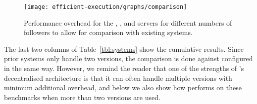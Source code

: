 \begin{figure}[!t]
 \centering
 \texttt{[image: efficient-execution/graphs/comparison]}
 \caption{Performance overhead for the \httpd, \thttpd, and \lighttpd
   servers for different numbers of followers to allow for comparison
   with existing systems.}
 \label{fig:comparison}
\end{figure}


The last two columns of Table~\ref{tbl:systems} show the cumulative
results.  Since prior systems only handle two versions, the comparison
is done against \varan configured in the same way.  However, we remind
the reader that one of the strengths of \varan's decentralised
architecture is that it can often handle multiple versions with minimum
additional overhead, and below we also show how \varan performs on
these benchmarks when more than two versions are used.

